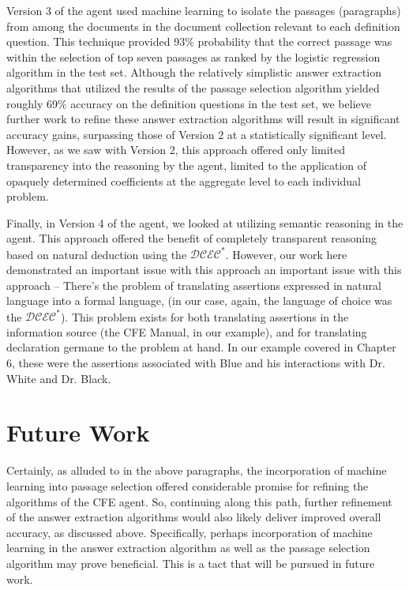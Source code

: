 Version 3 of the agent used machine learning to isolate the passages (paragraphs) from among the documents in the document collection relevant to each definition question. This technique provided 93\% probability that the correct passage was within the selection of top seven passages as ranked by the logistic regression
algorithm in the test set. Although the relatively simplistic answer extraction algorithms that utilized the results of the passage selection algorithm yielded roughly 69\% accuracy on the definition questions in the test set, we believe further work to refine these answer extraction algorithms will result in significant accuracy gains, surpassing those of Version 2 at a statistically significant level. However, as we saw with Version 2, this approach offered only limited transparency into the reasoning by the agent, limited to the application of opaquely determined coefficients at the aggregate level to each individual problem.

Finally, in Version 4 of the agent, we looked at utilizing semantic reasoning in the agent. This approach offered the benefit of completely transparent reasoning based on natural deduction using the $\mathcal{DCEC}^\ast$.  However, our work here demonstrated an important issue with this approach an important issue with this approach – There’s the problem of translating assertions expressed in natural language into a formal language, (in our case, again, the language of choice was the $\mathcal{DCEC}^\ast$).  This problem exists for both translating assertions in the information source (the CFE Manual, in our example), and for translating declaration germane to the problem at hand. In our example covered in Chapter 6, these were the assertions associated with Blue and his interactions with Dr. White and Dr. Black.

\section{Future Work}

Certainly, as alluded to in the above paragraphs, the incorporation of machine learning into passage selection offered considerable promise for refining the algorithms of the CFE agent. So, continuing along this path, further refinement of the answer extraction algorithms would also likely deliver improved overall accuracy, as discussed above. Specifically, perhaps incorporation of machine learning in the answer extraction algorithm as well as the passage selection algorithm may prove beneficial. This is a tact that will be pursued in future work.

